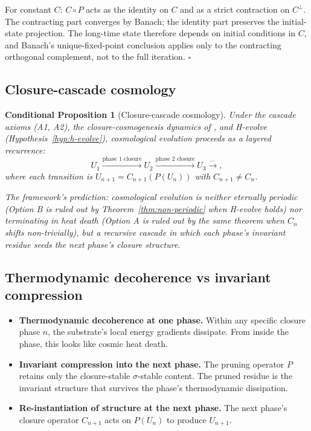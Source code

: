 \documentclass[11pt]{article}
\theoremstyle{plain}
\newtheorem{conditional}[theorem]{Conditional Proposition}
\theoremstyle{definition}
\theoremstyle{remark}
\begin{document}
For constant $C$: $C \circ P$ acts as the identity on $C$ and as a strict contraction on $C^\perp$. The contracting part converges by Banach; the identity part preserves the initial-state projection. The long-time state therefore depends on initial conditions in $C$, and Banach's unique-fixed-point conclusion applies only to the contracting orthogonal complement, not to the full iteration. \hfill$\square$

\subsection{Closure-cascade cosmology}

\begin{conditional}[Closure-cascade cosmology]\label{cthm:closure-cascade}
Under the cascade axioms (A1, A2), the closure-cosmogenesis dynamics of \citet{SmartClosureCosmogenesis}, and H-evolve (Hypothesis~\ref{hyp:h-evolve}), cosmological evolution proceeds as a layered recurrence:
\[
  U_1 \xrightarrow{\text{phase 1 closure}} U_2 \xrightarrow{\text{phase 2 closure}} U_3 \xrightarrow{\cdots},
\]
where each transition is $U_{n+1} = C_{n+1}(P(U_n))$ with $C_{n+1} \neq C_n$.

The framework's prediction: cosmological evolution is neither eternally periodic (Option B is ruled out by Theorem~\ref{thm:non-periodic} when H-evolve holds) nor terminating in heat death (Option A is ruled out by the same theorem when $C_n$ shifts non-trivially), but a recursive cascade in which each phase's invariant residue seeds the next phase's closure structure.
\end{conditional}

\subsection{Thermodynamic decoherence vs invariant compression}

\begin{itemize}[leftmargin=2em]
\item \textbf{Thermodynamic decoherence at one phase.} Within any specific closure phase $n$, the substrate's local energy gradients dissipate. From inside the phase, this looks like cosmic heat death.
\item \textbf{Invariant compression into the next phase.} The pruning operator $P$ retains only the closure-stable $\sigma$-stable content. The pruned residue is the invariant structure that survives the phase's thermodynamic dissipation.
\item \textbf{Re-instantiation of structure at the next phase.} The next phase's closure operator $C_{n+1}$ acts on $P(U_n)$ to produce $U_{n+1}$.
\end{itemize}
\end{document}
